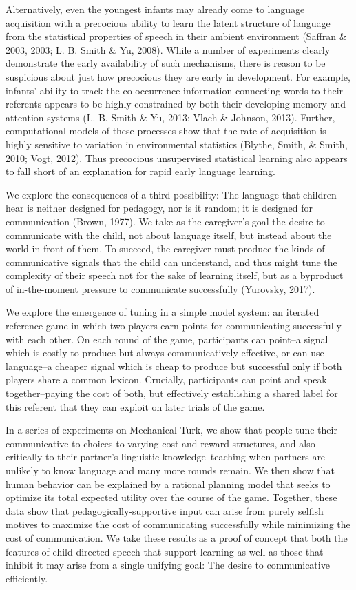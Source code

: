 \documentclass[10pt, letterpaper]{article}
\begin{document}
Alternatively, even the youngest infants may already come to language
acquisition with a precocious ability to learn the latent structure of
language from the statistical properties of speech in their ambient
environment (Saffran \& 2003, 2003; L. B. Smith \& Yu, 2008). While a
number of experiments clearly demonstrate the early availability of such
mechanisms, there is reason to be suspicious about just how precocious
they are early in development. For example, infants' ability to track
the co-occurrence information connecting words to their referents
appears to be highly constrained by both their developing memory and
attention systems (L. B. Smith \& Yu, 2013; Vlach \& Johnson, 2013).
Further, computational models of these processes show that the rate of
acquisition is highly sensitive to variation in environmental statistics
(Blythe, Smith, \& Smith, 2010; Vogt, 2012). Thus precocious
unsupervised statistical learning also appears to fall short of an
explanation for rapid early language learning.

We explore the consequences of a third possibility: The language that
children hear is neither designed for pedagogy, nor is it random; it is
designed for communication (Brown, 1977). We take as the caregiver's
goal the desire to communicate with the child, not about language
itself, but instead about the world in front of them. To succeed, the
caregiver must produce the kinds of communicative signals that the child
can understand, and thus might tune the complexity of their speech not
for the sake of learning itself, but as a byproduct of in-the-moment
pressure to communicate successfully (Yurovsky, 2017).

We explore the emergence of tuning in a simple model system: an iterated
reference game in which two players earn points for communicating
successfully with each other. On each round of the game, participants
can point--a signal which is costly to produce but always
communicatively effective, or can use language--a cheaper signal which
is cheap to produce but successful only if both players share a common
lexicon. Crucially, participants can point and speak together--paying
the cost of both, but effectively establishing a shared label for this
referent that they can exploit on later trials of the game.

In a series of experiments on Mechanical Turk, we show that people tune
their communicative to choices to varying cost and reward structures,
and also critically to their partner's linguistic knowledge--teaching
when partners are unlikely to know language and many more rounds remain.
We then show that human behavior can be explained by a rational planning
model that seeks to optimize its total expected utility over the course
of the game. Together, these data show that pedagogically-supportive
input can arise from purely selfish motives to maximize the cost of
communicating successfully while minimizing the cost of communication.
We take these results as a proof of concept that both the features of
child-directed speech that support learning as well as those that
inhibit it may arise from a single unifying goal: The desire to
communicative efficiently.
\end{document}
